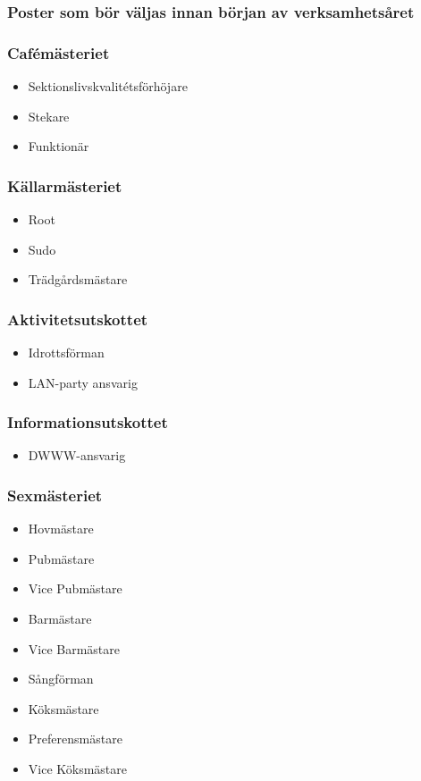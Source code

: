 \documentclass{dsekkallelse}
\begin{document}
\subsubsection{Poster som bör väljas innan början av verksamhetsåret}
\begin{multicols}{2}

\subsubsection{Cafémästeriet}
\begin{itemize}
    \item Sektionslivskvalitétsförhöjare
    \item Stekare
    \item Funktionär
\end{itemize}

\subsubsection{Källarmästeriet}
\begin{itemize}
    \item Root
    \item Sudo
    \item Trädgårdsmästare
\end{itemize}

\subsubsection{Aktivitetsutskottet}
\begin{itemize}
    \item Idrottsförman
    \item LAN-party ansvarig
\end{itemize}

\subsubsection{Informationsutskottet}
\begin{itemize}
    \item DWWW-ansvarig
\end{itemize}

\subsubsection{Sexmästeriet}
\begin{itemize}
    \item Hovmästare
    \item Pubmästare
    \item Vice Pubmästare
    \item Barmästare
    \item Vice Barmästare
    \item Sångförman
    \item Köksmästare
    \item Preferensmästare
    \item Vice Köksmästare
\end{itemize}


\end{multicols}
\end{document}
